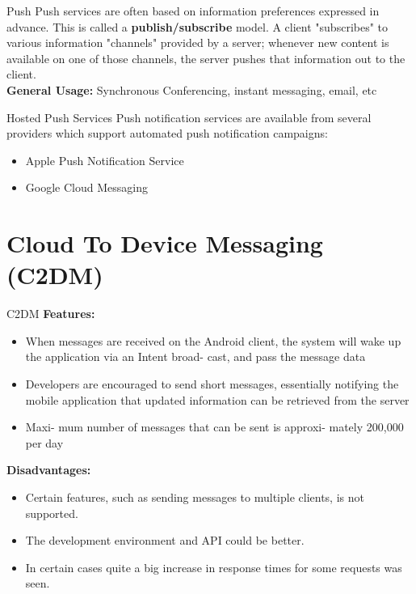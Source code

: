 \documentclass[10pt]{beamer}
\begin{document}
\begin{frame}[fragile]{Push}
      Push services are often based on information preferences expressed in advance. This is called a \textbf{publish/subscribe} model. A client "subscribes" to various information "channels" provided by a server; whenever new content is available on one of those channels, the server pushes that information out to the client.\\
      \vspace{5mm}\textbf{General Usage:} Synchronous Conferencing, instant messaging, email, etc
\end{frame}

\begin{frame}{Hosted Push Services}
Push notification services are available from several providers which support automated push notification campaigns:
  \begin{itemize}
    \item Apple Push Notification Service
    \item Google Cloud Messaging
  \end{itemize}
\end{frame}

\section{Cloud To Device Messaging (C2DM)}

\begin{frame}[fragile]{C2DM}
      \textbf{Features:}\\
      \begin{itemize}
      		\item When messages are received on the Android client, the
system will wake up the application via an Intent broad-
cast, and pass the message data
		\item Developers are encouraged to
send short messages, essentially notifying the mobile
application that updated information can be retrieved
from the server
		\item Maxi-
mum number of messages that can be sent is approxi-
mately 200,000 per day
	\end{itemize}

      \vspace{5mm}\textbf{Disadvantages:} 
      	\begin{itemize}
      		\item Certain features, such as sending messages to
multiple clients, is not supported.
		\item The development environment and API could be better.
		\item In certain cases
quite a big increase in response times for some requests was seen.
	\end{itemize}
\end{frame}
\end{document}
